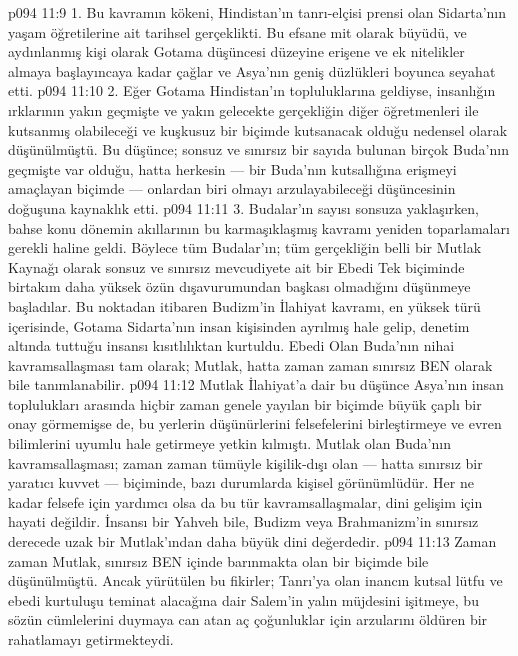 \vs p094 11:9 1.\bibnobreakspace {} Bu kavramın kökeni, Hindistan’ın tanrı\hyp{}elçisi prensi olan Sidarta’nın yaşam öğretilerine ait tarihsel gerçeklikti. Bu efsane mit olarak büyüdü, ve aydınlanmış kişi olarak Gotama düşüncesi düzeyine erişene ve ek nitelikler almaya başlayıncaya kadar çağlar ve Asya’nın geniş düzlükleri boyunca seyahat etti.
\vs p094 11:10 2.\bibnobreakspace {} Eğer Gotama Hindistan’ın topluluklarına geldiyse, insanlığın ırklarının yakın geçmişte ve yakın gelecekte gerçekliğin diğer öğretmenleri ile kutsanmış olabileceği ve kuşkusuz bir biçimde kutsanacak olduğu nedensel olarak düşünülmüştü. Bu düşünce; sonsuz ve sınırsız bir sayıda bulunan birçok Buda’nın geçmişte var olduğu, hatta herkesin --- bir Buda’nın kutsallığına erişmeyi amaçlayan biçimde --- onlardan biri olmayı arzulayabileceği düşüncesinin doğuşuna kaynaklık etti.
\vs p094 11:11 3.\bibnobreakspace {} Budalar’ın sayısı sonsuza yaklaşırken, bahse konu dönemin akıllarının bu karmaşıklaşmış kavramı yeniden toparlamaları gerekli haline geldi. Böylece tüm Budalar’ın; tüm gerçekliğin belli bir Mutlak Kaynağı olarak sonsuz ve sınırsız mevcudiyete ait bir Ebedi Tek biçiminde birtakım daha yüksek özün dışavurumundan başkası olmadığını düşünmeye başladılar. Bu noktadan itibaren Budizm’in İlahiyat kavramı, en yüksek türü içerisinde, Gotama Sidarta’nın insan kişisinden ayrılmış hale gelip, denetim altında tuttuğu insansı kısıtlılıktan kurtuldu. Ebedi Olan Buda’nın nihai kavramsallaşması tam olarak; Mutlak, hatta zaman zaman sınırsız BEN olarak bile tanımlanabilir.
\vs p094 11:12 Mutlak İlahiyat’a dair bu düşünce Asya’nın insan toplulukları arasında hiçbir zaman genele yayılan bir biçimde büyük çaplı bir onay görmemişse de, bu yerlerin düşünürlerini felsefelerini birleştirmeye ve evren bilimlerini uyumlu hale getirmeye yetkin kılmıştı. Mutlak olan Buda’nın kavramsallaşması; zaman zaman tümüyle kişilik\hyp{}dışı olan --- hatta sınırsız bir yaratıcı kuvvet --- biçiminde, bazı durumlarda kişisel görünümlüdür. Her ne kadar felsefe için yardımcı olsa da bu tür kavramsallaşmalar, dini gelişim için hayati değildir. İnsansı bir Yahveh bile, Budizm veya Brahmanizm’in sınırsız derecede uzak bir Mutlak’ından daha büyük dini değerdedir.
\vs p094 11:13 Zaman zaman Mutlak, sınırsız BEN içinde barınmakta olan bir biçimde bile düşünülmüştü. Ancak yürütülen bu fikirler; Tanrı’ya olan inancın kutsal lütfu ve ebedi kurtuluşu teminat alacağına dair Salem’in yalın müjdesini işitmeye, bu sözün cümlelerini duymaya can atan aç çoğunluklar için arzularını öldüren bir rahatlamayı getirmekteydi.
